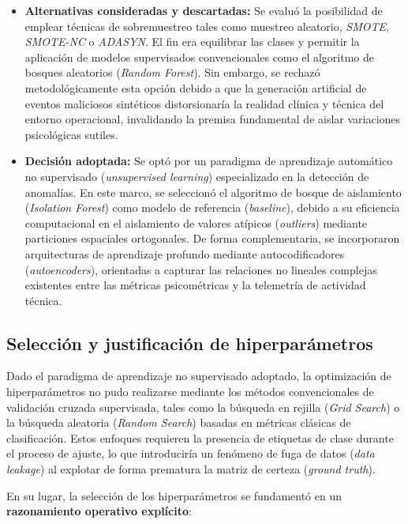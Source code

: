 \documentclass[IB]{TFUOC}%
\begin{document}
\begin{itemize}
    \item \textbf{Alternativas consideradas y descartadas:} 
    Se evaluó la posibilidad de emplear técnicas de sobremuestreo tales como muestreo aleatorio, \textit{SMOTE}, \textit{SMOTE-NC} o \textit{ADASYN}. El fin era equilibrar las clases y permitir la aplicación de modelos supervisados convencionales como el algoritmo de bosques aleatorios (\textit{Random Forest}). Sin embargo, se rechazó metodológicamente esta opción debido a que la generación artificial de eventos maliciosos sintéticos distorsionaría la realidad clínica y técnica del entorno operacional, invalidando la premisa fundamental de aislar variaciones psicológicas sutiles.

    \item \textbf{Decisión adoptada:} 
    Se optó por un paradigma de aprendizaje automático no supervisado (\textit{unsupervised learning}) especializado en la detección de anomalías. En este marco, se seleccionó el algoritmo de bosque de aislamiento (\textit{Isolation Forest}) como modelo de referencia (\textit{baseline}), debido a su eficiencia computacional en el aislamiento de valores atípicos (\textit{outliers}) mediante particiones espaciales ortogonales. De forma complementaria, se incorporaron arquitecturas de aprendizaje profundo mediante autocodificadores (\textit{autoencoders}), orientadas a capturar las relaciones no lineales complejas existentes entre las métricas psicométricas y la telemetría de actividad técnica.
\end{itemize}

\subsection{Selección y justificación de hiperparámetros}

Dado el paradigma de aprendizaje no supervisado adoptado, la optimización de hiperparámetros no pudo realizarse mediante los métodos convencionales de validación cruzada supervisada, tales como la búsqueda en rejilla (\textit{Grid Search}) o la búsqueda aleatoria (\textit{Random Search}) basadas en métricas clásicas de clasificación. Estos enfoques requieren la presencia de etiquetas de clase durante el proceso de ajuste, lo que introduciría un fenómeno de fuga de datos (\textit{data leakage}) al explotar de forma prematura la matriz de certeza (\textit{ground truth}).

\medskip
\noindent En su lugar, la selección de los hiperparámetros se fundamentó en un \textbf{razonamiento operativo explícito}:
\end{document}
